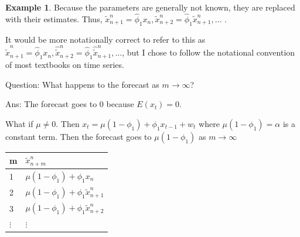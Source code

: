 \documentclass[
]{book}
\theoremstyle{definition}
\theoremstyle{definition}
\newtheorem{example}{Example}[chapter]
\theoremstyle{definition}
\theoremstyle{definition}
\theoremstyle{remark}
\begin{document}
\begin{example}
Because the parameters are generally not known, they are replaced with their estimates. Thus, \(\tilde x^n_{n+1} = \hat \phi_1x_n , \tilde x^n_{n+2} = \hat\phi_1\tilde x_{n+1}^n,…\) .

It would be more notationally correct to refer to this as \(\hat{\tilde x}^n_{n+1} = \hat \phi_1 x_n , \hat{\tilde x}^n_{n+2} = \hat \phi_1 \hat{\tilde x}^n_{n+1} , …\), but I chose to follow the notational convention of most textbooks on time series.

Question: What happens to the forecast as \(m \to \infty\)?

Ans: The forecast goes to 0 because \(E(x_t) = 0\).

What if \(\mu \ne 0\). Then \(x_t = \mu(1-\phi_1) + \phi_1x_{t-1} + w_t\) where \(\mu(1-\phi_1) = \alpha\) is a constant term. Then the forecast goes to \(\mu(1-\phi_1)\) as \(m \to \infty\)

\begin{longtable}[]{@{}ll@{}}
\toprule()
m & \(\tilde x^n_{n+m}\) \\
\midrule()
\endhead
1 & \(\mu(1-\phi_1)+\phi_1x_n\) \\
2 & \(\mu(1-\phi_1)+\phi_1\tilde x^n_{n+1}\) \\
3 & \(\mu(1-\phi_1)+\phi_1\tilde x^n_{n+2}\) \\
\(\vdots\) & \(\vdots\) \\
\bottomrule()
\end{longtable}

\end{example}
\end{document}
